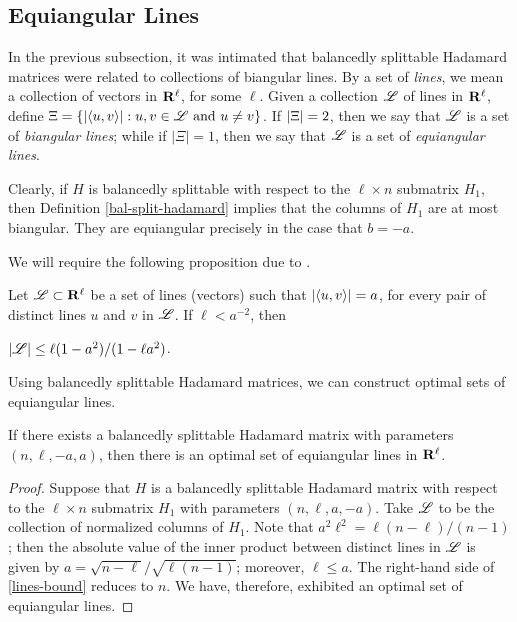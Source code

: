 \documentclass[../../../main]{subfiles}
\begin{document}
\subsection{Equiangular Lines}

In the previous subsection, it was intimated that balancedly splittable Hadamard
matrices were related to collections of biangular lines. By a set of {\it
  lines}, we mean a collection of vectors in $\mathbf{R}^\ell$, for some $\ell$. Given a
collection $\mathscr{L}$ of lines in $\mathbf{R}^\ell$, define $\Xi=\{|\langle u,v\rangle| : u,v \in
\mathscr{L} \text{ and } u \neq v\}$. If $|\Xi|=2$, then we say that $\mathscr{L}$ is a set
of {\it biangular lines}; while if $|\Xi|=1$, then we say that $\mathscr{L}$ is a set of
{\it equiangular lines}.

Clearly, if $H$ is balancedly splittable with respect to the $\ell \times n$ submatrix $H_1$, then Definition \ref{bal-split-hadamard} implies that the columns of $H_1$ are at most biangular. They are equiangular precisely in the case that $b=-a$.

We will require the following proposition due to \cite{spherical-codes-designs}.

\begin{prop}
 Let $\mathscr{L} \subset \mathbf{R}^\ell$ be a set of lines (vectors) such that $|\langle u,v\rangle|=a$, for every pair of distinct lines $u$ and $v$ in $\mathscr{L}$. If $\ell < a^{-2}$, then
 \begin{defenum}
  \item\label{lines-bound} $|\mathscr{L}| \leq \ell(1-a^2)/(1-\ell a^2)$.
 \end{defenum}
\end{prop}

Using balancedly splittable Hadamard matrices, we can construct optimal sets of equiangular lines.

\begin{thm}
 If there exists a balancedly splittable Hadamard matrix with parameters $(n,\ell,-a,a)$, then there is an optimal set of equiangular lines in $\mathbf{R}^\ell$.
\end{thm}

\begin{proof}
 Suppose that $H$ is a balancedly splittable Hadamard matrix with respect to the $\ell \times n$ submatrix $H_1$ with parameters $(n,\ell,a,-a)$. Take $\mathscr{L}$ to be the collection of normalized columns of $H_1$. Note that $a^2\ell^2=\ell(n-\ell)/(n-1)$; then the absolute value of the inner product between distinct lines in $\mathscr{L}$ is given by $a=\sqrt{n-\ell}/\sqrt{\ell(n-1)}$; moreover, $\ell \leq a$. The right-hand side of \ref{lines-bound} reduces to $n$. We have, therefore, exhibited an optimal set of equiangular lines.
\end{proof}
\end{document}
